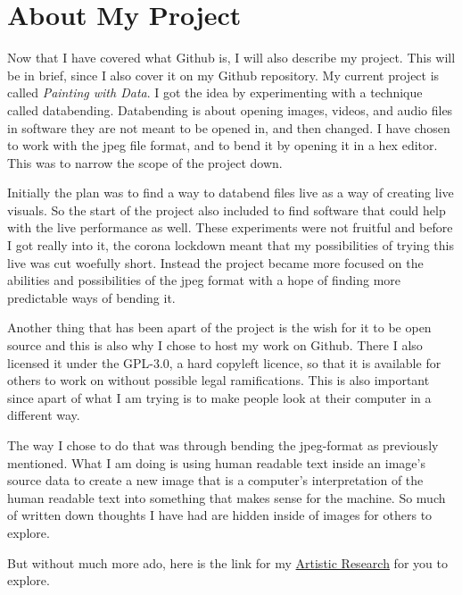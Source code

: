 \documentclass[12pt, letterpaper]{article}
\begin{document}
\section{About My Project}
Now that I have covered what Github is, I will also describe my project. This
will be in brief, since I also cover it on my Github repository. My current
project is called \textit{Painting with Data}. I got the idea by experimenting
with a technique called databending. Databending is about opening images,
videos, and audio files in software they are not meant to be opened in, and then
changed. I have chosen to work with the jpeg file format, and to bend it by
opening it in a hex editor. This was to narrow the scope of the project down.
\par
Initially the plan was to find a way to databend files live as a way of creating
live visuals. So the start of the project also included to find software that
could help with the live performance as well. These experiments were not
fruitful and before I got really into it, the corona lockdown meant that my
possibilities of trying this live was cut woefully short. Instead the project
became more focused on the abilities and possibilities of the jpeg format with a
hope of finding more predictable ways of bending it.
\par
Another thing that has been apart of the project is the wish for it to be open
source and this is also why I chose to host my work on Github. There I also
licensed it under the GPL-3.0, a hard copyleft licence, so that it is available
for others to work on without possible legal ramifications. This is also
important since apart of what I am trying is to make people look at their
computer in a different way.
\par
The way I chose to do that was through bending the jpeg-format as previously
mentioned. What I am doing is using human readable text inside an image's source
data to create a new image that is a computer's interpretation of the human
readable text into something that makes sense for the machine. So much of
written down thoughts I have had are hidden inside of images for others to
explore.
\par
\medskip
\noindent But without much more ado, here is the link for my
\href{https://github.com/aa-83/artistic_research}{Artistic Research} for you
to explore.
\end{document}
